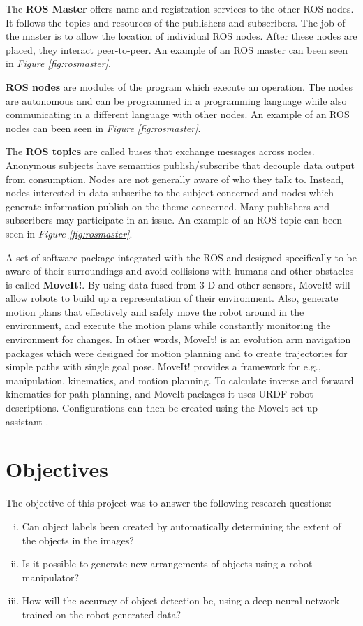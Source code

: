 The \textbf{ROS Master} offers name and registration services to the other ROS nodes. It follows the topics and resources of the publishers and subscribers. The job of the master is to allow the location of individual ROS nodes. After these nodes are placed, they interact peer-to-peer\cite{noauthor_master_nodate}. An example of an ROS master can been seen in \textit{Figure \ref{fig:rosmaster}}.


\textbf{ROS nodes} are modules of the program which execute an operation. 
The nodes are autonomous and can be programmed in a programming language while also communicating in a different language with other nodes\cite{noauthor_rostutorialsunderstandingnodes_nodate}. An example of an ROS nodes can been seen in \textit{Figure \ref{fig:rosmaster}}.


The \textbf{ROS topics} are called buses that exchange messages across nodes. Anonymous subjects have semantics publish/subscribe that decouple data output from consumption. Nodes are not generally aware of who they talk to. Instead, nodes interested in data subscribe to the subject concerned and nodes which generate information publish on the theme concerned. Many publishers and subscribers may participate in an issue\cite{noauthor_topics_nodate}. An example of an ROS topic can been seen in \textit{Figure \ref{fig:rosmaster}}.

A set of software package integrated with the ROS and designed specifically to be aware of their surroundings and avoid collisions with humans and other obstacles is called \textbf{MoveIt!}. By using data fused from 3-D and other sensors, MoveIt! will allow robots to build up a representation of their environment. Also, generate motion plans that effectively and safely move the robot around in the environment, and execute the motion plans while constantly monitoring the environment for changes. In other words, MoveIt! is an evolution arm navigation packages which were designed for motion planning and to create trajectories for simple paths with single goal pose. MoveIt! provides a framework for e.g., manipulation, kinematics, and motion planning. To calculate inverse and forward kinematics for path planning, and MoveIt packages it uses URDF robot descriptions. Configurations can then be created using the MoveIt set up assistant \cite{chitta_moveitros_2012}.

\section{Objectives}
The objective of this project was to answer the following research questions:
\begin{enumerate}[i.]
    \item Can object labels been created by automatically determining the extent of the objects in the images?
    \item Is it possible to generate new arrangements of objects using a robot manipulator?
    \item How will the accuracy of object detection be, using a deep neural network trained on the robot-generated data?
\end{enumerate}